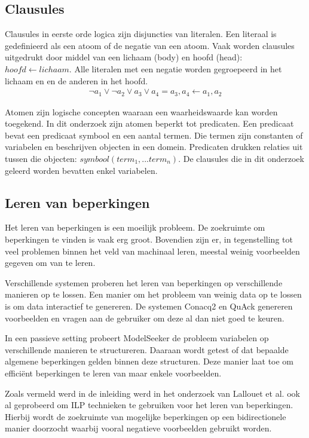 \subsection{Clausules}
Clausules in eerste orde logica zijn disjuncties van literalen.
Een literaal is gedefinieerd als een atoom of de negatie van een atoom.
Vaak worden clausules uitgedrukt door middel van een lichaam (body) en hoofd (head): $\mathit{hoofd} \leftarrow \mathit{lichaam}$.
Alle literalen met een negatie worden gegroepeerd in het lichaam en en de anderen in het hoofd.
\begin{align*}
  \lnot a_1 \lor \lnot a_2 \lor a_3 \lor a_4 = a_3, a_4 \leftarrow a_1, a_2 
\end{align*}

Atomen zijn logische concepten waaraan een waarheidswaarde kan worden toegekend.
In dit onderzoek zijn atomen beperkt tot predicaten.
Een predicaat bevat een predicaat symbool en een aantal termen.
Die termen zijn constanten of variabelen en beschrijven objecten in een domein.
Predicaten drukken relaties uit tussen die objecten: $\mathit{symbool}(\mathit{term_1}, ... \mathit{term_n})$.
De clausules die in dit onderzoek geleerd worden bevatten enkel variabelen.

\subsection{Leren van beperkingen}
Het leren van beperkingen is een moeilijk probleem.
De zoekruimte om beperkingen te vinden is vaak erg groot.
Bovendien zijn er, in tegenstelling tot veel problemen binnen het veld van machinaal leren, meestal weinig voorbeelden gegeven om van te leren.

Verschillende systemen proberen het leren van beperkingen op verschillende manieren op te lossen.
Een manier om het probleem van weinig data op te lossen is om data interactief te genereren.
De systemen Conacq2\cite{bessiere2007query} en QuAck\cite{bessiere2013constraint} genereren voorbeelden en vragen aan de gebruiker om deze al dan niet goed te keuren.

In een passieve setting probeert ModelSeeker\cite{Beldiceanu:ModelSeeker} de probleem variabelen op verschillende manieren te structureren.
Daaraan wordt getest of dat bepaalde algemene beperkingen gelden binnen deze structuren.
Deze manier laat toe om effici\"ent beperkingen te leren van maar enkele voorbeelden.

Zoals vermeld werd in de inleiding werd in het onderzoek van Lallouet et al.\cite{Lallouet:LearningCP} ook al geprobeerd om ILP technieken te gebruiken voor het leren van beperkingen.
Hierbij wordt de zoekruimte van mogelijke beperkingen op een bidirectionele manier doorzocht waarbij vooral negatieve voorbeelden gebruikt worden.

